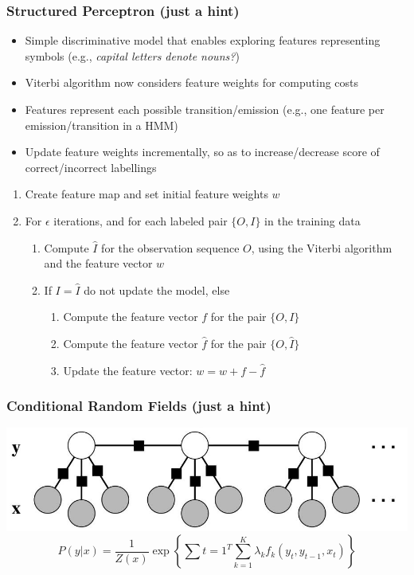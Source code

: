 \documentclass{beamer}
\begin{document}
\begin{frame} \frametitle{Structured Perceptron (just a hint)}
  
   \begin{itemize}
   \scriptsize
   \item Simple discriminative model that enables exploring features representing symbols (e.g., {\it capital letters denote nouns?})
   \item Viterbi algorithm now considers feature weights for computing costs
   \item Features represent each possible transition/emission (e.g., one feature per emission/transition in a HMM)
   \item Update feature weights incrementally, so as to increase/decrease score of correct/incorrect labellings
   \end{itemize}
  
   \begin{block}{}
   \begin{enumerate}
   \item Create feature map and set initial feature weights $w$
   \item For $\epsilon$ iterations, and for each labeled pair $\{O,I\}$ in the training data
   \begin{enumerate}
   \item Compute $\hat{I}$ for the observation sequence $O$, using the Viterbi algorithm and the feature vector $w$
   \item If $I=\hat{I}$ do not update the model, else
   \begin{enumerate}
   \item Compute the feature vector $f$ for the pair $\{O,I\}$
   \item Compute the feature vector $\hat{f}$ for the pair $\{O,\hat{I}\}$
   \item Update the feature vector: $w = w + f - \hat{f}$
   \end{enumerate}
   \end{enumerate}
   \end{enumerate}
   \end{block}
 
 \end{frame}

 \begin{frame}
     \frametitle{Conditional Random Fields (just a hint)}
     \centering
     \includegraphics[width=.9\linewidth]{crf}
     \begin{displaymath}
         P(y|x) = \frac{1}{Z(x)}\exp\left\{\sum{t=1}^T \sum_{k=1}^K\lambda_kf_k(y_t, y_{t-1}, x_t)\right\}
     \end{displaymath}
 \end{frame}
\end{document}
